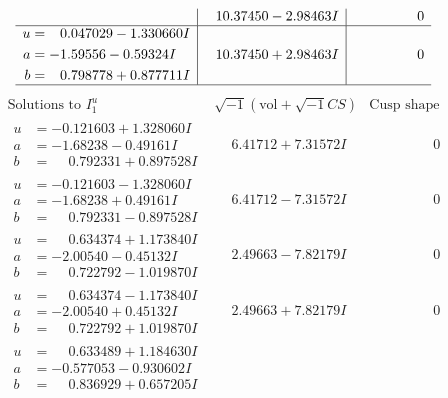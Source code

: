 \documentclass[1p]{elsarticle_modified}
\theoremstyle{definition}
\newcommand{\I}{\sqrt{-1}}
\begin{document}
$$\begin{array}{c|c|c}
 & \phantom{-}10.37450 - 2.98463 I & \phantom{-0.000000 } 0 \\ \hline\begin{aligned}
u &= \phantom{-}0.047029 - 1.330660 I \\
a &= -1.59556 - 0.59324 I \\
b &= \phantom{-}0.798778 + 0.877711 I\end{aligned}
 & \phantom{-}10.37450 + 2.98463 I & \phantom{-0.000000 } 0\\
 \hline 
 \end{array}$$\newpage$$\begin{array}{c|c|c}  
\text{Solutions to }I^u_{1}& \I (\text{vol} + \sqrt{-1}CS) & \text{Cusp shape}\\
 \hline 
\begin{aligned}
u &= -0.121603 + 1.328060 I \\
a &= -1.68238 - 0.49161 I \\
b &= \phantom{-}0.792331 + 0.897528 I\end{aligned}
 & \phantom{-}6.41712 + 7.31572 I & \phantom{-0.000000 } 0 \\ \hline\begin{aligned}
u &= -0.121603 - 1.328060 I \\
a &= -1.68238 + 0.49161 I \\
b &= \phantom{-}0.792331 - 0.897528 I\end{aligned}
 & \phantom{-}6.41712 - 7.31572 I & \phantom{-0.000000 } 0 \\ \hline\begin{aligned}
u &= \phantom{-}0.634374 + 1.173840 I \\
a &= -2.00540 - 0.45132 I \\
b &= \phantom{-}0.722792 - 1.019870 I\end{aligned}
 & \phantom{-}2.49663 - 7.82179 I & \phantom{-0.000000 } 0 \\ \hline\begin{aligned}
u &= \phantom{-}0.634374 - 1.173840 I \\
a &= -2.00540 + 0.45132 I \\
b &= \phantom{-}0.722792 + 1.019870 I\end{aligned}
 & \phantom{-}2.49663 + 7.82179 I & \phantom{-0.000000 } 0 \\ \hline\begin{aligned}
u &= \phantom{-}0.633489 + 1.184630 I \\
a &= -0.577053 - 0.930602 I \\
b &= \phantom{-}0.836929 + 0.657205 I\end{aligned}

\end{array}$$
\end{document}
